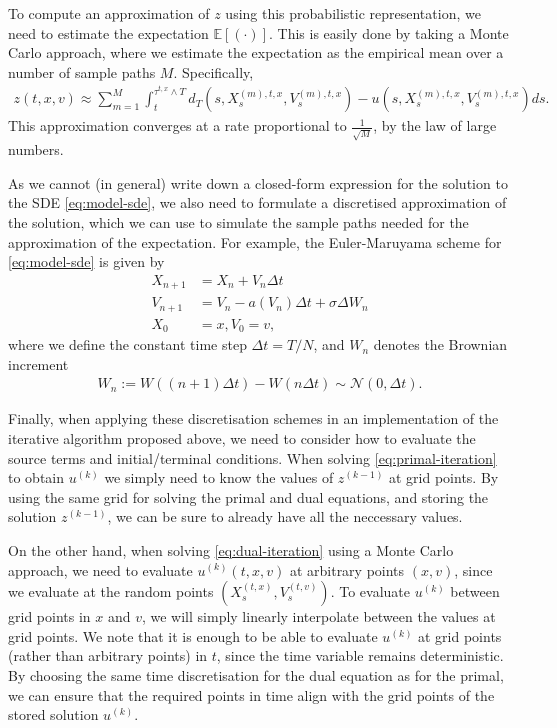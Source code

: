 To compute an approximation of $z$ using this probabilistic representation, we need to estimate the expectation $\mathbb{E}[(\cdot)]$. This is easily done by taking a Monte Carlo approach, where we estimate the expectation as the empirical mean over a number of sample paths $M$. Specifically,
%
\begin{align}
    \label{eq:dual-mc-approx}
    z(t,x,v) \approx \sum_{m=1}^{M} \int_t^{\tau^{t,x}\wedge T} d_T(s,X_s^{(m),t,x},V_s^{(m),t,x}) - u(s,X_s^{(m),t,x},V_s^{(m),t,x}) ds . 
\end{align}
%
This approximation converges at a rate proportional to $\frac{1}{\sqrt{M}}$, by the law of large numbers. 

As we cannot (in general) write down a closed-form expression for the solution to the SDE \autoref{eq:model-sde}, we also need to formulate a discretised approximation of the solution, which we can use to simulate the sample paths needed for the approximation of the expectation. For example, the Euler-Maruyama scheme for \autoref{eq:model-sde} is given by
%
\begin{align}
    X_{n+1} &= X_n + V_n \Delta t \\
    V_{n+1} &= V_n - a(V_n)\Delta t + \sigma \Delta W_n \\
    X_0 &= x, V_0 = v,
\end{align}
%
where we define the constant time step $\Delta t = T/N$, and $W_n$ denotes the Brownian increment
%
\begin{align} 
    W_n := W((n+1)\Delta t) - W(n\Delta t) \sim \mathcal{N}(0,\Delta t).
\end{align}
%

Finally, when applying these discretisation schemes in an implementation of the iterative algorithm proposed above, we need to consider how to evaluate the source terms and initial/terminal conditions. When solving \autoref{eq:primal-iteration} to obtain $u^{(k)}$ we simply need to know the values of $z^{(k-1)}$ at grid points. By using the same grid for solving the primal and dual equations, and storing the solution $z^{(k-1)}$, we can be sure to already have all the neccessary values.

On the other hand, when solving \autoref{eq:dual-iteration} using a Monte Carlo approach, we need to evaluate $u^{(k)}(t,x,v)$ at arbitrary points $(x,v)$, since we evaluate at the random points $(X_s^{(t,x)},V_s^{(t,v)})$. To evaluate $u^{(k)}$ between grid points in $x$ and $v$, we will simply linearly interpolate between the values at grid points.
We note that it is enough to be able to evaluate $u^{(k)}$ at grid points (rather than arbitrary points) in $t$, since the time variable remains deterministic. By choosing the same time discretisation for the dual equation as for the primal, we can ensure that the required points in time align with the grid points of the stored solution $u^{(k)}$. 

